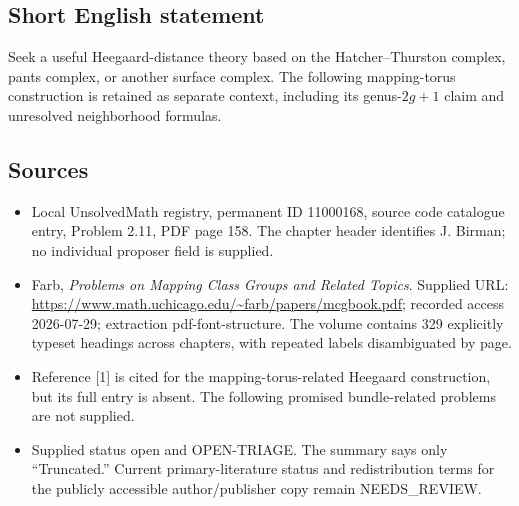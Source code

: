 \documentclass[11pt]{article}
\begin{document}
\subsection{Short English statement}
Seek a useful Heegaard-distance theory based on the Hatcher--Thurston complex, pants complex, or another surface complex. The following mapping-torus construction is retained as separate context, including its genus-\(2g+1\) claim and unresolved neighborhood formulas.
\subsection{Sources}
\begin{itemize}
\item Local UnsolvedMath registry, permanent ID 11000168, source code catalogue entry, Problem 2.11, PDF page 158. The chapter header identifies J. Birman; no individual proposer field is supplied.
\item Farb, \emph{Problems on Mapping Class Groups and Related Topics}. Supplied URL: \url{https://www.math.uchicago.edu/~farb/papers/mcgbook.pdf}; recorded access 2026-07-29; extraction pdf-font-structure. The volume contains 329 explicitly typeset headings across chapters, with repeated labels disambiguated by page.
\item Reference [1] is cited for the mapping-torus-related Heegaard construction, but its full entry is absent. The following promised bundle-related problems are not supplied.
\item Supplied status open and OPEN-TRIAGE. The summary says only ``Truncated.'' Current primary-literature status and redistribution terms for the publicly accessible author/publisher copy remain NEEDS\_REVIEW.
\end{itemize}
\end{document}
